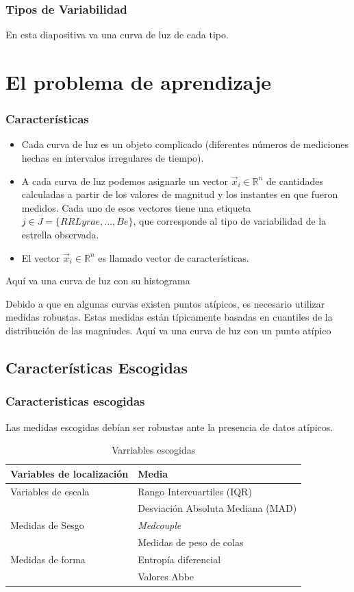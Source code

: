 \documentclass{beamer}
\begin{document}
\begin{frame}
  \frametitle{Tipos de Variabilidad}
  En esta diapositiva va una curva de luz de cada tipo.
\end{frame}


\section{El problema de aprendizaje}
\begin{frame}%
  \frametitle{Características}
\begin{itemize}
   \item Cada curva de luz es un objeto complicado (diferentes números de mediciones hechas en intervalos irregulares de tiempo).  
   \item A cada curva de luz podemos asignarle un vector $\vec{x}_i\in\mathbb{R}^n$ de cantidades calculadas a partir de los valores de magnitud y los instantes en que fueron medidos. Cada uno de esos vectores tiene una etiqueta $j\in J = \{RR Lyrae,..., Be\}$, que corresponde al tipo de variabilidad de la estrella observada.
     \item El vector $\vec{x}_i\in\mathbb{R}^n$  es llamado vector de características.
\end{itemize}
\end{frame}

\begin{frame}
  Aquí va una curva de luz con su histograma
\end{frame}

\begin{frame}
  Debido a que en algunas curvas existen puntos atípicos, es necesario utilizar medidas robustas. Estas medidas están típicamente basadas en cuantiles de la distribución de las magniudes. 
  Aquí va una curva de luz con un punto atípico
\end{frame}

\subsection{Características Escogidas}
\begin{frame}
\frametitle{Caracteristicas escogidas}
Las medidas escogidas debían ser robustas ante la presencia de datos atípicos.
\begin{table}
  \centering
  \begin{tabular}{ll}
    \hline
    Variables de localización & Media \\
    \hline
    Variables de escala & Rango Intercuartiles (IQR) \\
    & Desviación Absoluta Mediana (MAD) \\
    Medidas de Sesgo & \textit{Medcouple} \\
    & Medidas de peso de colas \\
    Medidas de forma & Entropía diferencial \\
    & Valores Abbe \\
  \end{tabular}
  \caption{Varriables escogidas}
\end{table}

\end{frame}
\end{document}
